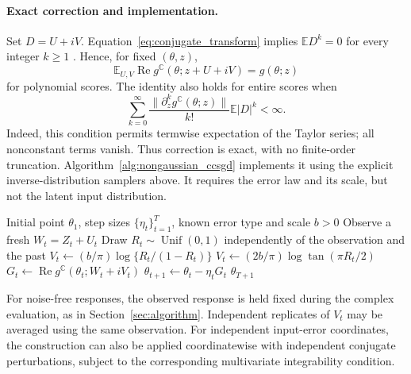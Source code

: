 \paragraph{Exact correction and implementation.}
Set $D=U+iV$. Equation~\eqref{eq:conjugate_transform} implies
$\mathbb E D^k=0$ for every integer $k\ge1$
\cite{conjugatecriterion2026}. Hence, for fixed $(\theta,z)$,
\begin{equation}\label{eq:nongaussian_correction}
\mathbb E_{U,V}\operatorname{Re}g^{\mathbb C}(\theta;z+U+iV)
=g(\theta;z)
\end{equation}
for polynomial scores. The identity also holds for entire scores when
\begin{equation}\label{eq:nongaussian_taylor}
\sum_{k=0}^\infty
\frac{\|\partial_z^k g^{\mathbb C}(\theta;z)\|}{k!}
\mathbb E|D|^k<\infty.
\end{equation}
Indeed, this condition permits termwise expectation of the Taylor series;
all nonconstant terms vanish. Thus correction is exact, with no
finite-order truncation. Algorithm~\ref{alg:nongaussian_ccsgd} implements
it using the explicit inverse-distribution samplers above. It requires
the error law and its scale, but not the latent input distribution.

\begin{algorithm}[H]
\caption{CCSGD for uniform or symmetric two-point measurement error}
\label{alg:nongaussian_ccsgd}
\begin{algorithmic}[1]
\Require Initial point $\theta_1$, step sizes $\{\eta_t\}_{t=1}^T$, known error type and scale $b>0$
    \State Observe a fresh $W_t=Z_t+U_t$
    \State Draw $R_t\sim\operatorname{Unif}(0,1)$ independently of the observation and the past
        \State $V_t\gets(b/\pi)\log\{R_t/(1-R_t)\}$
    \Else{}
        \State $V_t\gets(2b/\pi)\log\tan(\pi R_t/2)$
    \EndIf
    \State $G_t\gets\operatorname{Re}g^{\mathbb C}(\theta_t;W_t+iV_t)$
    \State $\theta_{t+1}\gets\theta_t-\eta_tG_t$
\EndFor
\State \Return $\theta_{T+1}$
\end{algorithmic}
\end{algorithm}
For noise-free responses, the observed response is held fixed during the
complex evaluation, as in Section~\ref{sec:algorithm}. Independent
replicates of $V_t$ may be averaged using the same observation. For
independent input-error coordinates, the construction can also be applied
coordinatewise with independent conjugate perturbations, subject to the
corresponding multivariate integrability condition.

